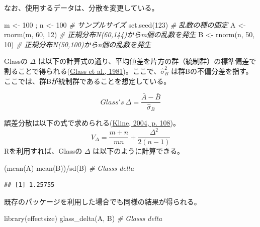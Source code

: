 \documentclass[
  ja=standard, xelatex, base=12pt]{bxjsreport}
\newenvironment{Shaded}{\begin{snugshade}}{\end{snugshade}}
\newcommand{\CommentTok}[1]{\textcolor[rgb]{0.56,0.35,0.01}{\textit{#1}}}
\newcommand{\DecValTok}[1]{\textcolor[rgb]{0.00,0.00,0.81}{#1}}
\newcommand{\FunctionTok}[1]{\textcolor[rgb]{0.00,0.00,0.00}{#1}}
\newcommand{\NormalTok}[1]{#1}
\newcommand{\OtherTok}[1]{\textcolor[rgb]{0.56,0.35,0.01}{#1}}
\newcommand{\SpecialCharTok}[1]{\textcolor[rgb]{0.00,0.00,0.00}{#1}}
\begin{document}
なお、使用するデータは、分散を変更している。

\begin{Shaded}
\begin{Highlighting}[]
\NormalTok{m }\OtherTok{\textless{}{-}} \DecValTok{100}\NormalTok{ ; n }\OtherTok{\textless{}{-}} \DecValTok{100}   \CommentTok{\# サンプルサイズ}
\FunctionTok{set.seed}\NormalTok{(}\DecValTok{123}\NormalTok{)         }\CommentTok{\# 乱数の種の固定}
\NormalTok{A }\OtherTok{\textless{}{-}} \FunctionTok{rnorm}\NormalTok{(m, }\DecValTok{60}\NormalTok{, }\DecValTok{12}\NormalTok{) }\CommentTok{\# 正規分布N(60,144)からm個の乱数を発生}
\NormalTok{B }\OtherTok{\textless{}{-}} \FunctionTok{rnorm}\NormalTok{(n, }\DecValTok{50}\NormalTok{, }\DecValTok{10}\NormalTok{) }\CommentTok{\# 正規分布N(50,100)からn個の乱数を発生}
\end{Highlighting}
\end{Shaded}

Glassの \(\Delta\) は以下の計算式の通り、平均値差を片方の群（統制群）の標準偏差で割ることで得られる(\protect\hyperlink{ref-glass1981}{Glass et al., 1981})。ここで、\(\hat\sigma_B^2\) は群Bの不偏分差を指す。ここでは、群Bが統制群であることを想定している。

\[
Glass's~\Delta =\frac{\bar{A}-\bar{B}}{\hat\sigma_B} 
\]

誤差分散は以下の式で求められる(\protect\hyperlink{ref-kline2004}{Kline, 2004, p. 108})。\[
V_{\Delta}=\frac{m+n}{mn}+\frac {\Delta^2}{2(n-1)} 
\] Rを利用すれば、Glassの \(\Delta\) は以下のように計算できる。

\begin{Shaded}
\begin{Highlighting}[]
\NormalTok{(}\FunctionTok{mean}\NormalTok{(A)}\SpecialCharTok{{-}}\FunctionTok{mean}\NormalTok{(B))}\SpecialCharTok{/}\FunctionTok{sd}\NormalTok{(B)  }\CommentTok{\# Glass\textquotesingle{}s delta}
\end{Highlighting}
\end{Shaded}

\begin{verbatim}
## [1] 1.25755
\end{verbatim}

既存のパッケージを利用した場合でも同様の結果が得られる。

\begin{Shaded}
\begin{Highlighting}[]
\FunctionTok{library}\NormalTok{(effectsize)}
\FunctionTok{glass\_delta}\NormalTok{(A, B)  }\CommentTok{\# Glass\textquotesingle{}s delta}
\end{Highlighting}
\end{Shaded}
\end{document}
